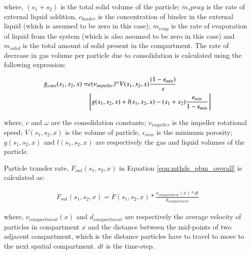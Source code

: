 \documentclass[preprint,11pt,authoryear]{elsarticle}
\begin{document}
where, $(s_1+s_2)$  is the total solid volume of the particle; $\dot{m}_spray$ is the rate of external
liquid addition, $c_{binder}$ is the concentration of binder in the external liquid (which is assumed to
be zero in this case); $\dot{m}_{evap}$ is the rate of evaporation of liquid from
the system (which is also assumed to be zero in this case) and $m_{solid}$ is the total amount of solid
present in the compartment.
The rate of decrease in gas volume per particle due to consolidation is calculated using the
following expression: \citep{Verkoeijen2002}

\begin{align}
\dot{g}_{cons}(s_1,s_2,x)=&c (\nu_{impeller})^{\omega}V(s_1,s_2,x)\frac{(1-\epsilon_{min})}{s} 
\notag \\ 
& \left[g(s_1,s_2,x)+l(s_1,s_2,x) -(s_1+s_2)\frac{\epsilon_{min}}{1-\epsilon_{min}}\right]
\label{eqn:mthds_rate_gas_vol_part}
\end{align}

 where, $c$ and $\omega$ are the consolidation constants; $v_{impeller}$ is the impeller
rotational speed; $V(s_1,s_2,x)$ is the volume of particle, $\epsilon_{min}$ is the minimum porosity;
$g(s_1,s_2,x)$ and $l(s_1,s_2,x)$ are respectively the gas and liquid volumes of the particle.

 Particle transfer rate, $\dot{F}_{out}(s_1,s_2,x)$ in Equation \ref{eqn:mthds_pbm_overall} is calculated
as:

\begin{align}
\dot{F}_{out}(s_1,s_2,x) = \dot{F}(s_1,s_2,x)*\frac{\nu_{compartment}(x)*dt}{d_{compartment}}
\label{eqn:mthds_f_out_dot_part_trans_rate}
\end{align}

where, $\nu_{compartment}(x)$ and $d_{compartment}$ are respectively the average velocity of
particles in compartment $x$ and the distance between the mid-points of two adjacent compartment,
which is the distance particles have to travel to move to the next spatial compartment. $dt$ is the
time-step.
\end{document}
